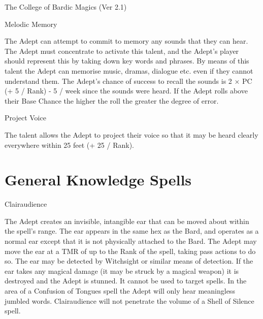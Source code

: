 \begin{Chapter}{The College of Bardic Magics (Ver 2.1)}
\begin{talent}[T-3]{Melodic Memory}

\begin{effects}
The Adept can attempt to commit to memory any sounds that they can
hear.  The Adept must concentrate to activate this talent, and the
Adept’s player should represent this by taking down key words and
phrases.  By means of this talent the Adept can memorise music,
dramas, dialogue etc.  even if they cannot understand them.  The
Adept’s chance of success to recall the sounds is 2 × PC (+ 5 / Rank)
- 5 / week since the sounds were heard. If the Adept rolls above their
Base Chance the higher the roll the greater the degree of error.
\end{effects}
\end{talent}

\begin{talent}[T-4]{Project Voice}

\begin{effects}
The talent allows the Adept to project their voice so that it may be
heard clearly everywhere within 25 feet (+ 25 / Rank).
\end{effects}
\end{talent}


\section{General Knowledge Spells}

\begin{spell}[G-1]{Clairaudience}

\begin{effects}
The Adept creates an invisible, intangible ear that can be moved about
within the spell’s range. The ear appears in the same hex as the Bard,
and operates as a normal ear except that it is not physically attached
to the Bard.  The Adept may move the ear at a TMR of up to the Rank of
the spell, taking pass actions to do so. The ear may be detected by
Witchsight or similar means of detection.  If the ear takes any
magical damage (it may be struck by a magical weapon) it is destroyed
and the Adept is stunned.  It cannot be used to target spells.  In the
area of a Confusion of Tongues spell the Adept will only hear
meaningless jumbled words.  Clairaudience will not penetrate the
volume of a Shell of Silence spell.
\end{effects}
\end{spell}


\end{Chapter}
